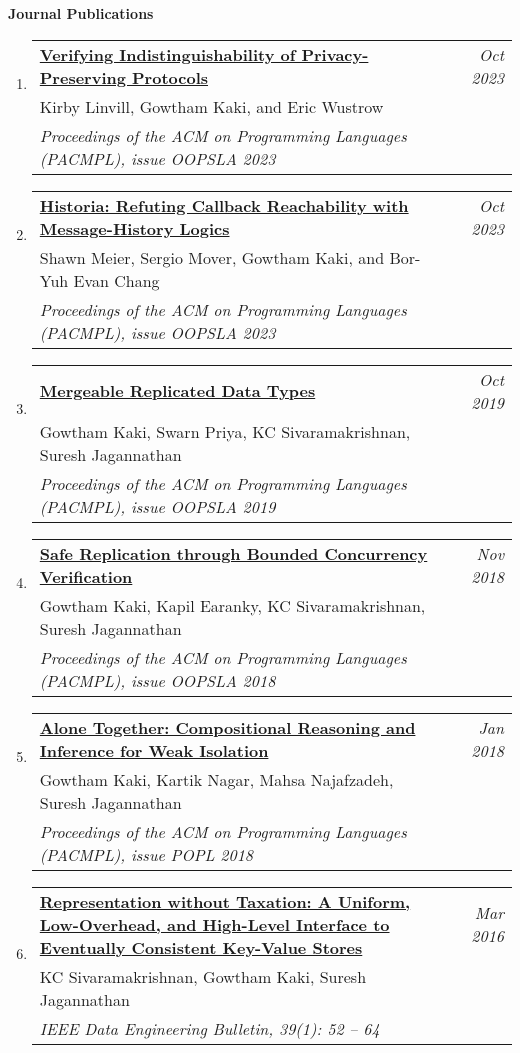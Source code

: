 \documentclass[10pt]{article}
\makeatletter
\newcommand{\lbar}[1]{{\color{#1}\ding{118}}\hspace*{2pt}}
\newenvironment{benumerate}[2]{
    \let\oldItem\item
    \def\item{\addtocounter{enumi}{-2}\oldItem}
    \begin{enumerate}[#2] \itemsep3pt
    \setcounter{enumi}{#1}
    \addtocounter{enumi}{1}}
  {\end{enumerate}}
\newenvironment{publication}[5]
{ \item
  \begin{tabular*}{7.5in}{p{6.3in}@{\extracolsep{\fill}}r}
    \href{#1}{\textbf{#2}} & \textit{#3}\\ #4 &\\ \textit{#5}&\\
  \end{tabular*}
} {}
\newenvironment{region}[3]{%
  \vspace*{0.5ex}
  {{\textbf{\large{#1}}}}
  \begin{benumerate}{#3}{\color{RoyalBlue}#2}}
  {\end{benumerate}\vspace{0.8ex}}
\makeatother
\begin{document}
\begin{region} {\lbar{Mahogany}Journal Publications}{{J}1}{4}

  \begin{publication}{https://gowthamk.github.io/docs/oopsla23a.pdf}
		{Verifying Indistinguishability of Privacy-Preserving Protocols }
    {Oct 2023}{Kirby Linvill, Gowtham Kaki, and Eric Wustrow}
		{Proceedings of the ACM on Programming Languages (PACMPL), issue OOPSLA 2023}
  \end{publication}

  \begin{publication}{https://gowthamk.github.io/docs/oopsla23b.pdf}
		{Historia: Refuting Callback Reachability with Message-History Logics}
    {Oct 2023}{Shawn Meier, Sergio Mover, Gowtham Kaki, and Bor-Yuh Evan Chang}
		{Proceedings of the ACM on Programming Languages (PACMPL), issue OOPSLA 2023}
  \end{publication}

	\begin{publication}{https://gowthamk.github.io/docs/mrdt.pdf}
		{Mergeable Replicated Data Types}
    {Oct 2019}{Gowtham Kaki, Swarn Priya, KC Sivaramakrishnan, Suresh Jagannathan}
		{Proceedings of the ACM on Programming Languages (PACMPL), issue OOPSLA 2019}
  \end{publication}

	\begin{publication}{https://gowthamk.github.io/docs/q9.pdf}
		{Safe Replication through Bounded Concurrency Verification}
    {Nov 2018}{Gowtham Kaki, Kapil Earanky, KC Sivaramakrishnan, Suresh Jagannathan}
		{Proceedings of the ACM on Programming Languages (PACMPL), issue OOPSLA 2018}
  \end{publication}

  \begin{publication}{https://gowthamk.github.io/docs/popl18.pdf}
    {Alone Together: Compositional Reasoning and Inference for Weak Isolation}
    {Jan 2018}
    {Gowtham Kaki, Kartik Nagar, Mahsa Najafzadeh, Suresh Jagannathan}
    {Proceedings of the ACM on Programming Languages (PACMPL), issue POPL 2018}
  \end{publication}

  \begin{publication}{https://gowthamk.github.io/docs/quelea_ieee16.pdf}
    {Representation without Taxation: A Uniform, Low-Overhead, and High-Level Interface to Eventually Consistent Key-Value Stores}
    {Mar 2016}{KC Sivaramakrishnan, Gowtham Kaki, Suresh Jagannathan}
    {IEEE Data Engineering Bulletin, 39(1): 52 -- 64}
  \end{publication}
\end{region}
\end{document}
